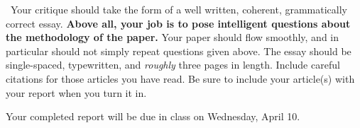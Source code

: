\par{}\ Your critique should take the form
of
a well written, coherent, grammatically correct essay.
{\bf Above all, your job is to pose intelligent questions about the
methodology of the paper.}  Your paper should flow smoothly, and in
particular
should not simply repeat questions given above.
The essay should be single-spaced, typewritten, and {\it roughly\/} three
pages
in length.  Include careful citations for those
articles you have read.
Be sure to include your article(s) with your report when you turn it in.

\vspace{0.2in}

\par\noindent Your completed report will be due in class on Wednesday,  April 10.



